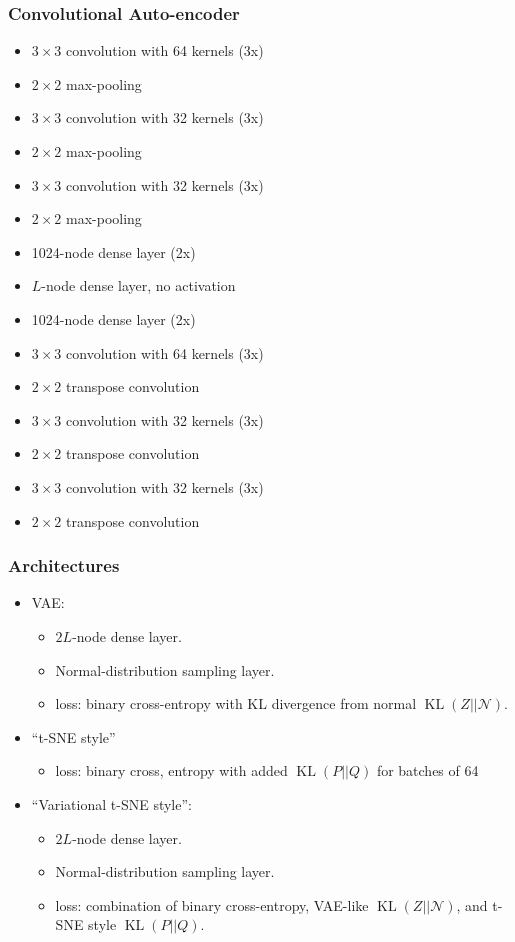 \documentclass[10pt, usenames, dvipsnames, table]{beamer}
\DeclareMathOperator{\kl}{KL}
\begin{document}
\begin{frame}
  \frametitle{Convolutional Auto-encoder}
  \begin{itemize}
  \item $3\times 3$ convolution with 64 kernels (3x)
  \item $2\times 2$ max-pooling
  \item $3\times 3$ convolution with 32 kernels (3x)
  \item $2\times 2$ max-pooling
  \item $3\times 3$ convolution with 32 kernels (3x)
  \item $2\times 2$ max-pooling
  \item 1024-node dense layer (2x)
  \item $L$-node dense layer, no activation
  \item 1024-node dense layer (2x)    
  \item $3\times 3$ convolution with 64 kernels (3x)
  \item $2\times 2$ transpose convolution
  \item $3\times 3$ convolution with 32 kernels (3x)
  \item $2\times 2$ transpose convolution
  \item $3\times 3$ convolution with 32 kernels (3x)
  \item $2\times 2$ transpose convolution
  \end{itemize}
\end{frame}

\begin{frame}
  \frametitle{Architectures}
  \begin{itemize}
  \item VAE:
    \begin{itemize}
    \item $2L$-node dense layer.
    \item Normal-distribution sampling layer.
    \item loss: binary cross-entropy with KL divergence from normal
      $\kl(Z||\mathcal{N})$.
    \end{itemize}
    \pause{}
  \item ``t-SNE style''
    \begin{itemize}
    \item loss: binary cross, entropy with added $\kl(P||Q)$ for batches of 64
    \end{itemize}
    \pause{}
  \item ``Variational t-SNE style'':
    \begin{itemize}
    \item $2L$-node dense layer.
    \item Normal-distribution sampling layer.
    \item loss: combination of binary cross-entropy, VAE-like
      $\kl(Z||\mathcal{N})$, and t-SNE style $\kl(P||Q)$.
    \end{itemize}
  \end{itemize}
\end{frame}
\end{document}
